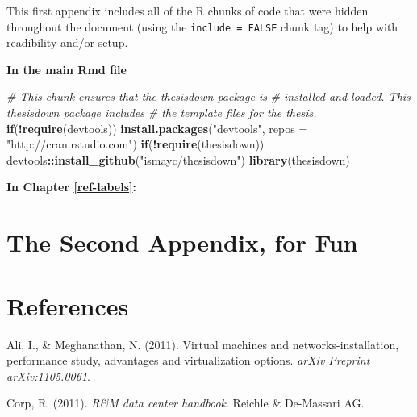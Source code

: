\documentclass[12pt,twoside]{reedthesis}
\newenvironment{Shaded}{\begin{snugshade}}{\end{snugshade}}
\newcommand{\CommentTok}[1]{\textcolor[rgb]{0.56,0.35,0.01}{\textit{#1}}}
\newcommand{\ControlFlowTok}[1]{\textcolor[rgb]{0.13,0.29,0.53}{\textbf{#1}}}
\newcommand{\DataTypeTok}[1]{\textcolor[rgb]{0.13,0.29,0.53}{#1}}
\newcommand{\KeywordTok}[1]{\textcolor[rgb]{0.13,0.29,0.53}{\textbf{#1}}}
\newcommand{\NormalTok}[1]{#1}
\newcommand{\OperatorTok}[1]{\textcolor[rgb]{0.81,0.36,0.00}{\textbf{#1}}}
\newcommand{\StringTok}[1]{\textcolor[rgb]{0.31,0.60,0.02}{#1}}
\theoremstyle{definition}
\theoremstyle{definition}
\theoremstyle{definition}
\theoremstyle{remark}
\begin{document}
This first appendix includes all of the R chunks of code that were
hidden throughout the document (using the \texttt{include\ =\ FALSE}
chunk tag) to help with readibility and/or setup.

\textbf{In the main Rmd file}
\begin{Shaded}
\begin{Highlighting}[]
\CommentTok{# This chunk ensures that the thesisdown package is}
\CommentTok{# installed and loaded. This thesisdown package includes}
\CommentTok{# the template files for the thesis.}
\ControlFlowTok{if}\NormalTok{(}\OperatorTok{!}\KeywordTok{require}\NormalTok{(devtools))}
  \KeywordTok{install.packages}\NormalTok{(}\StringTok{"devtools"}\NormalTok{, }\DataTypeTok{repos =} \StringTok{"http://cran.rstudio.com"}\NormalTok{)}
\ControlFlowTok{if}\NormalTok{(}\OperatorTok{!}\KeywordTok{require}\NormalTok{(thesisdown))}
\NormalTok{  devtools}\OperatorTok{::}\KeywordTok{install_github}\NormalTok{(}\StringTok{"ismayc/thesisdown"}\NormalTok{)}
\KeywordTok{library}\NormalTok{(thesisdown)}
\end{Highlighting}
\end{Shaded}
\textbf{In Chapter \ref{ref-labels}:}

\hypertarget{the-second-appendix-for-fun}{%
\chapter{The Second Appendix, for
Fun}\label{the-second-appendix-for-fun}}

\backmatter

\hypertarget{references}{%
\chapter*{References}\label{references}}


\noindent

\setlength{\parindent}{-0.20in}
\setlength{\leftskip}{0.20in}
\setlength{\parskip}{8pt}

\hypertarget{refs}{}
\leavevmode\hypertarget{ref-Cap3_2_mT}{}%
Ali, I., \& Meghanathan, N. (2011). Virtual machines and
networks-installation, performance study, advantages and virtualization
options. \emph{arXiv Preprint arXiv:1105.0061}.

\leavevmode\hypertarget{ref-Cap1_4_PdP}{}%
Corp, R. (2011). \emph{R\&M data center handbook}. Reichle \& De-Massari
AG.
\end{document}
